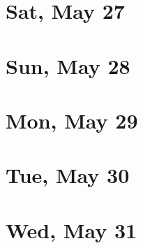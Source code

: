 	\section{Sat, May 27}
		
		
	\section{Sun, May 28}
		
		
	\section{Mon, May 29}
		
		
	\section{Tue, May 30}
		
		
	\section{Wed, May 31}
		
		
